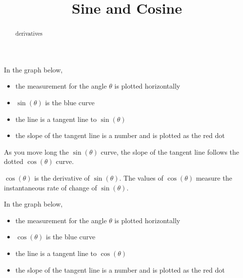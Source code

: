 \documentclass{ximera}
\title{Sine and Cosine}
\begin{document}
\begin{abstract}
derivatives
\end{abstract}
\maketitle








In the graph below, 

\begin{itemize}
\item the measurement for the angle $\theta$ is plotted horizontally
\item $\sin(\theta)$ is the blue curve
\item the line is a tangent line to $\sin(\theta)$
\item the slope of the tangent line is a number and is plotted as the red dot
\end{itemize}

As you move long the $\sin(\theta)$ curve, the slope of the tangent line follows the dotted $\cos(\theta)$ curve.



\begin{center}
\end{center}



$\cos(\theta)$ is the derivative of $\sin(\theta)$.  The values of $\cos(\theta)$ measure the instantaneous rate of change of $\sin(\theta)$.


















In the graph below, 

\begin{itemize}
\item the measurement for the angle $\theta$ is plotted horizontally
\item $\cos(\theta)$ is the blue curve
\item the line is a tangent line to $\cos(\theta)$
\item the slope of the tangent line is a number and is plotted as the red dot
\end{itemize}
\end{document}
